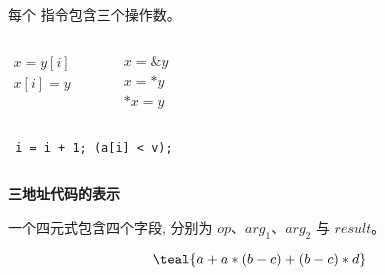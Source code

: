 \begin{frame}{}
  \begin{center}
    \begin{definition}
      每个  指令包含三个操作数。
    \end{definition}

    \vspace{0.80cm}
    \begin{columns}
        \begin{align}
          x = y[i] \\
          x[i] = y
        \end{align}
        \begin{center}
        \end{center}
        \pause
        \begin{align}
          x = \&y \\
          x = \ast y \\
          \ast x = y
        \end{align}
    \end{columns}
  \end{center}
\end{frame}

\begin{frame}{}
  \begin{center}
    \texttt{ i = i + 1;  (a[i] < v);}

    \vspace{0.80cm}
    \begin{columns}
        \pause
    \end{columns}
  \end{center}
\end{frame}

\begin{frame}{}
  \begin{center}
    {\bf 三地址代码的表示}

    \begin{definition}
      一个四元式包含四个字段, 分别为 $op$、$arg_{1}$、$arg_{2}$ 与 $result$。
    \end{definition}

    \pause
    \vspace{-0.50cm}
    \[
      \teal{a + a \ast (b - c) + (b - c) \ast d}
    \]
    \vspace{-0.80cm}
    \begin{columns}
    \end{columns}
  \end{center}
\end{frame}

